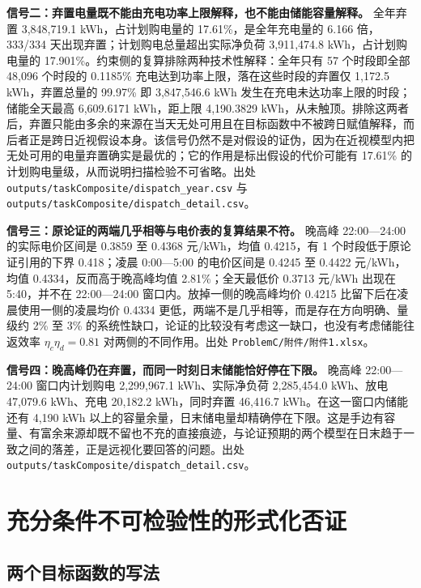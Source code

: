 \begin{appendices}
\textbf{信号二：弃置电量既不能由充电功率上限解释，也不能由储能容量解释。} 全年弃置 3,848,719.1 kWh，占计划购电量的 17.61\%，是全年充电量的 6.166 倍，333/334 天出现弃置；计划购电总量超出实际净负荷 3,911,474.8 kWh，占计划购电量的 17.901\%。约束侧的复算排除两种技术性解释：全年只有 57 个时段即全部 48,096 个时段的 0.1185\% 充电达到功率上限，落在这些时段的弃置仅 1,172.5 kWh，弃置总量的 99.97\% 即 3,847,546.6 kWh 发生在充电未达功率上限的时段；储能全天最高 6,609.6171 kWh，距上限 4,190.3829 kWh，从未触顶。排除这两者后，弃置只能由多余的来源在当天无处可用且在目标函数中不被跨日赋值解释，而后者正是跨日近视假设本身。该信号仍然不是对假设的证伪，因为在近视模型内把无处可用的电量弃置确实是最优的；它的作用是标出假设的代价可能有 17.61\% 的计划购电量级，从而说明扫描检验不可省略。出处 \texttt{outputs/\allowbreak taskComposite/\allowbreak dispatch\_year.csv} 与 \texttt{outputs/\allowbreak taskComposite/\allowbreak dispatch\_detail.csv}。

\textbf{信号三：原论证的两端几乎相等与电价表的复算结果不符。} 晚高峰 22:00---24:00 的实际电价区间是 0.3859 至 0.4368 元/kWh，均值 0.4215，有 1 个时段低于原论证引用的下界 0.418；凌晨 0:00---5:00 的电价区间是 0.4245 至 0.4422 元/kWh，均值 0.4334，反而高于晚高峰均值 2.81\%；全天最低价 0.3713 元/kWh 出现在 5:40，并不在 22:00---24:00 窗口内。放掉一侧的晚高峰均价 0.4215 比留下后在凌晨使用一侧的凌晨均价 0.4334 更低，两端不是几乎相等，而是存在方向明确、量级约 2\% 至 3\% 的系统性缺口，论证的比较没有考虑这一缺口，也没有考虑储能往返效率 $\eta_c\eta_d=0.81$ 对两侧的不同作用。出处 \texttt{ProblemC/附件/附件1.xlsx}。

\textbf{信号四：晚高峰仍在弃置，而同一时刻日末储能恰好停在下限。} 晚高峰 22:00---24:00 窗口内计划购电 2,299,967.1 kWh、实际净负荷 2,285,454.0 kWh、放电 47,079.6 kWh、充电 20,182.2 kWh，同时弃置 46,416.7 kWh。在这一窗口内储能还有 4,190 kWh 以上的容量余量，日末储电量却精确停在下限。这是手边有容量、有富余来源却既不留也不充的直接痕迹，与论证预期的两个模型在日末趋于一致之间的落差，正是远视化要回答的问题。出处 \texttt{outputs/\allowbreak taskComposite/\allowbreak dispatch\_detail.csv}。

\section{充分条件不可检验性的形式化否证}

\subsection{两个目标函数的写法}


\end{appendices}
